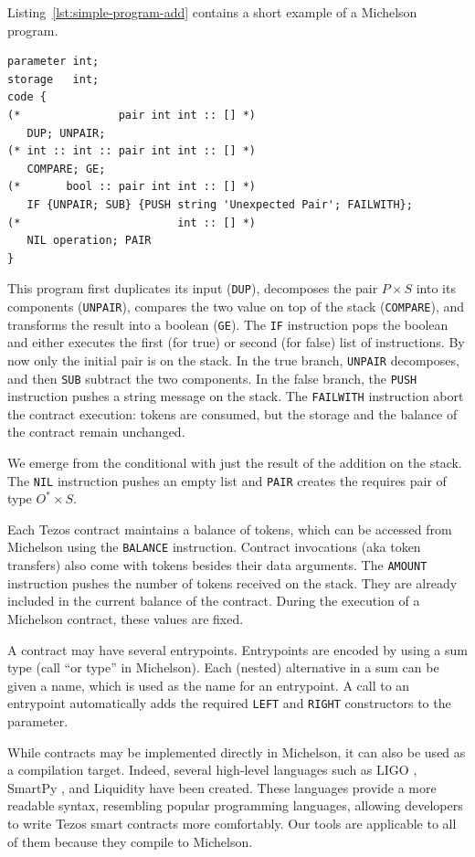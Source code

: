 \documentclass[a4paper,USenglish,cleveref, autoref, thm-restate]{lipics-v2021}
\begin{document}
Listing~\ref {lst:simple-program-add} contains a short example of a Michelson program.
\begin{lstlisting}[float=tp,captionpos=b,caption={A Michelson program},label={lst:simple-program-add}]
parameter int;
storage   int;
code { 
(*               pair int int :: [] *)
   DUP; UNPAIR;
(* int :: int :: pair int int :: [] *)
   COMPARE; GE; 
(*       bool :: pair int int :: [] *)
   IF {UNPAIR; SUB} {PUSH string 'Unexpected Pair'; FAILWITH};
(*                        int :: [] *)
   NIL operation; PAIR
}
\end{lstlisting}
This program first duplicates its input (\lstinline|DUP|), decomposes
the pair $P\times S$ into its components (\lstinline|UNPAIR|),
compares the two value on top of the stack (\lstinline|COMPARE|), and
transforms the result into a boolean (\lstinline|GE|). The
\lstinline|IF| instruction pops the boolean and either executes the
first (for true) or second (for false) list of instructions. By now
only the initial pair is on the stack. In the true branch,
\lstinline|UNPAIR| decomposes, and then \lstinline|SUB| subtract the two 
components. In the false branch, the \lstinline|PUSH| instruction pushes
a string message on the stack. The \lstinline|FAILWITH| instruction
abort the contract execution: tokens are consumed, but the storage and
the balance of the contract remain unchanged.

We emerge from the conditional with just the result of the addition on
the stack. The \lstinline|NIL| instruction pushes an empty list and
\lstinline|PAIR| creates the requires pair of type $O^* \times S$.

Each Tezos contract maintains a balance of tokens, which can be
accessed from Michelson using the \lstinline|BALANCE|
instruction. Contract invocations (aka token transfers) also come with
tokens besides their data arguments. The \lstinline|AMOUNT|
instruction pushes the number of tokens received on the stack. They
are already included in the current balance of the contract. During the
execution of a Michelson contract, these values are fixed. 

A contract may have several entrypoints. Entrypoints are encoded by
using a sum type (call ``or type'' in Michelson). Each (nested) alternative in a sum can be
given a name, which is used as the name for an entrypoint. A call to
an entrypoint automatically adds the required \lstinline|LEFT| and
\lstinline|RIGHT| constructors to the parameter.

While contracts may be implemented directly in Michelson, it can also
be used as a compilation target. Indeed, several high-level languages
such as LIGO \cite{ligo}, SmartPy \cite{smartpy}, and Liquidity \cite{liquidity} have been created. These languages provide a more readable syntax, resembling popular
programming languages, allowing developers to write Tezos smart
contracts more comfortably. Our tools are applicable to all of them
because they compile to Michelson.
\lstset{language=Caml}
\end{document}
